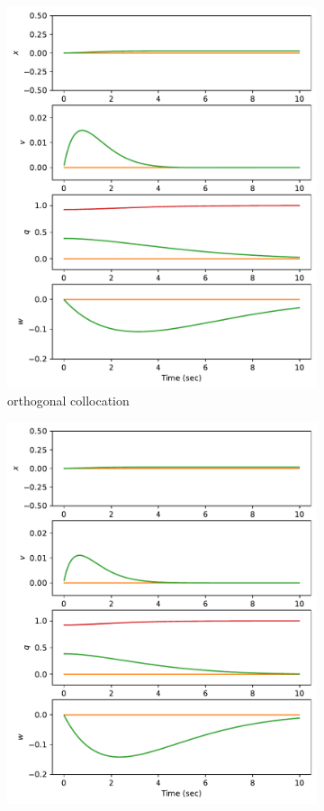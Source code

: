 \documentclass[]{article}
\begin{document}
\begin{figure}[H]
\begin{subfigure}[b]{0.3\textwidth}
		\includegraphics[width=\textwidth]{figures/state45dz1.pdf}
		\caption{orthogonal collocation}
	\end{subfigure}%
	\begin{subfigure}[b]{0.3\textwidth}
		\centering
		\includegraphics[width=\textwidth]{figures/state45dz2.pdf}

\end{subfigure}
\end{figure}
\end{document}
